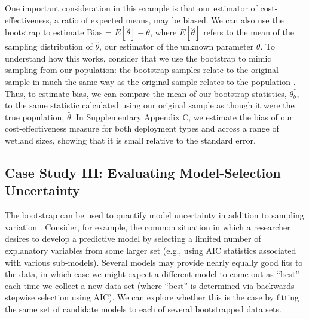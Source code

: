 \documentclass[fleqn,10pt]{wlpeerj} %
\begin{document}
One important consideration in this example is that our estimator of cost-effectiveness, a ratio of expected means, may be biased. We can also use the bootstrap to estimate Bias = \(E[\hat{\theta}]-\theta\), where \(E[\hat{\theta}]\) refers to the mean of the sampling distribution of \(\hat{\theta}\), our estimator of the unknown parameter \(\theta\). To understand how this works, consider that we use the bootstrap to mimic sampling from our population: the bootstrap samples relate to the original sample in much the same way as the original sample relates to the population \citep[Fig. 2]{hall1988theoretical}. Thus, to estimate bias, we can compare the mean of our bootstrap statistics, \(\theta^*_b\), to the same statistic calculated using our original sample as though it were the true population, \(\hat{\theta}\). In Supplementary Appendix C, we estimate the bias of our cost-effectiveness measure for both deployment types and across a range of wetland sizes, showing that it is small relative to the standard error.

\hypertarget{case-study-iii-evaluating-model-selection-uncertainty}{%
\subsection*{Case Study III: Evaluating Model-Selection Uncertainty}\label{case-study-iii-evaluating-model-selection-uncertainty}}

The bootstrap can be used to quantify model uncertainty in addition to sampling variation \citep{buckland1997model, Fieberg2015, harrell_2016}. Consider, for example, the common situation in which a researcher desires to develop a predictive model by selecting a limited number of explanatory variables from some larger set (e.g., using AIC statistics associated with various sub-models). Several models may provide nearly equally good fits to the data, in which case we might expect a different model to come out as ``best'' each time we collect a new data set (where ``best'' is determined via backwards stepwise selection using AIC). We can explore whether this is the case by fitting the same set of candidate models to each of several bootstrapped data sets.
\end{document}
